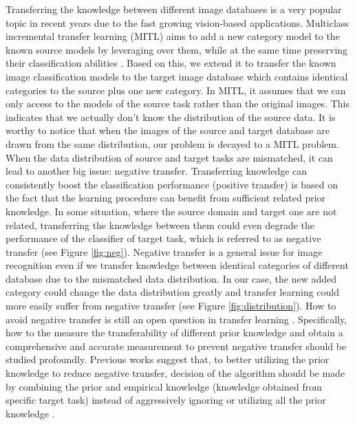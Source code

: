 Transferring the knowledge between different image databases is a very popular topic in recent years due to the fast growing vision-based applications. Multiclass incremental transfer learning (MITL) aims to add a new category model to the known source models by leveraging over them, while at the same time preserving their classification abilities \cite{kuzborskij2013n}. Based on this, we extend it to transfer the known image classification models to the target image database which contains identical categories to the source plus one new category. In MITL, it assumes that we can only access to the models of the source task rather than the original images. This indicates that we actually don't know the distribution of the source  data. It is worthy to notice that when the images of the source and target database are drawn from the same distribution, our problem is decayed to a MITL problem. When the data distribution of source and target tasks are mismatched, it can lead to another big issue: negative transfer. Transferring knowledge can consistently boost the classification performance (positive transfer) is based on the fact that the learning procedure can benefit from sufficient related prior knowledge. In some situation, where the source domain and target one are not related, transferring the knowledge between them could even degrade the performance of the classifier of target task, which is referred to as negative transfer (see Figure \ref{fig:neg}). 
Negative transfer is a general issue for image recognition even if we transfer knowledge between identical categories of different database due to the mismatched data distribution. In our case, the new added category could change the data distribution greatly and transfer learning could more easily suffer from negative transfer (see Figure \ref{fig:distribution}). 
How to avoid negative transfer is still an open question in transfer learning \cite{Lu201514}. Specifically, how to the measure the transferability of different prior knowledge and obtain a comprehensive and accurate measurement to prevent negative transfer should be studied profoundly. Previous works suggest that, to better utilizing the prior knowledge to reduce negative transfer, decision of the algorithm should be made by combining the prior and empirical knowledge (knowledge obtained from specific target task) instead of aggressively ignoring or utilizing all the prior knowledge \cite{tommasi2014learning} \cite{kuzborskij2013n} \cite{yang2007cross} \cite{aytar2011tabula}.
